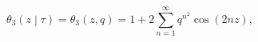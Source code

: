 \[\theta_{3}\left(z\middle|\tau\right)=\theta_{3}\left(z,q\right)=1+2\sum\limits%
_{n=1}^{\infty}q^{n^{2}}\cos\left(2nz\right),\]